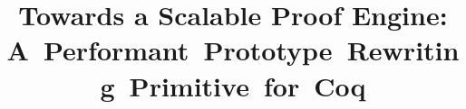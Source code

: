 \documentclass[sn-mathphys,pdflatex]{sn-jnl}%
\makeatletter
\renewcommand{\todo}[2][]{\tikzexternaldisable\@todo[#1]{#2}\tikzexternalenable}
\theoremstyle{thmstyleone}%
\theoremstyle{thmstyletwo}%
\theoremstyle{thmstylethree}%
\makeatother
\begin{document}
\VerbatimFootnotes

\title[Towards a Scalable Proof Engine]{Towards a Scalable Proof Engine: \mbox{\large A~Performant Prototype Rewriting Primitive for Coq}}


\newcommand{\versionofrecordtext}{%
This version of the article has been accepted for publication, after peer review, but is not the Version of Record and does not reflect post-acceptance improvements / corrections.
Version of Record: \url{https://dx.doi.org/10.1007/s10817-024-09705-6}.
}
\newcommand{\fundingtext}{%
This work was supported in part by a Google Research Award, National Science Foundation grants CCF-1253229, CCF-1512611, and CCF-1521584, and the National Science Foundation Graduate Research Fellowship under Grant Nos.\ 1122374 and 1745302.
Any opinion, findings, and conclusions or recommendations expressed in this material are those of the authors and do not necessarily reflect the views of the National Science Foundation.
\ifbool{arxiv}{\versionofrecordtext}{}%
}
\end{document}
